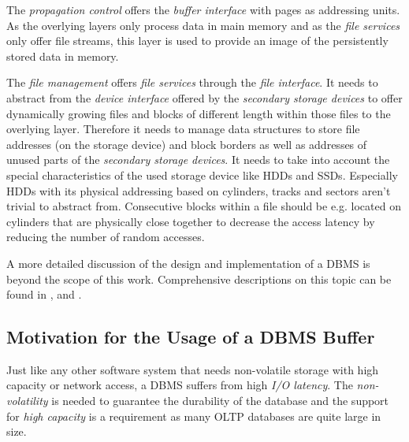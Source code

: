     The \emph{propagation control} offers the \emph{buffer interface} with pages as addressing units. As the overlying layers only process data in main memory and as the \emph{file services} only offer file streams, this layer is used to provide an image of the persistently stored data in memory. 

    The \emph{file management} offers \emph{file services} through the \emph{file interface}. It needs to abstract from the \emph{device interface} offered by the \emph{secondary storage devices} to offer dynamically growing files and blocks of different length within those files to the overlying layer. Therefore it needs to manage data structures to store file addresses (on the storage device) and block borders as well as addresses of unused parts of the \emph{secondary storage devices}. It needs to take into account the special characteristics of the used storage device like HDDs and SSDs. Especially HDDs with its physical addressing based on cylinders, tracks and sectors aren't trivial to abstract from. Consecutive blocks within a file should be e.g. located on cylinders that are physically close together to decrease the access latency by reducing the number of random accesses.

    A more detailed discussion of the design and implementation of a DBMS is beyond the scope of this work. Comprehensive descriptions on this topic can be found in \cite{GarciaMolina:2009}, \cite{Datenbanksysteme_-_Konzepte_und_Techniken_der_Implementierung} and \cite{Datenbanken_-_Implementierungstechniken}.

\subsection[Motivation for a DBMS Buffer]{Motivation for the Usage of a DBMS Buffer} \label{subsec:motivationbuffer}

    Just like any other software system that needs non-volatile storage with high capacity or network access, a DBMS suffers from high \emph{I/O latency}. The \emph{non-volatility} is needed to guarantee the durability of the database and the support for \emph{high capacity} is a requirement as many OLTP databases are quite large in size. 

